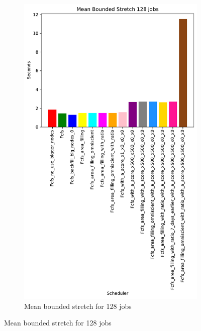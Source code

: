 \documentclass[a4paper]{article}
\begin{document}
\begin{figure}[H]
\begin{subfigure}[b]{0.4\linewidth}\centering\includegraphics[width=0.7\linewidth]{MBSS/plot/Results_Size_And_Data_2022-01-17->2022-01-17_V9532_Mean_Stretch_With_a_Minimum_128_450_128_32_256_4_1024.pdf}\caption{Mean bounded stretch for 128 jobs}\label{45}\end{subfigure}

\end{figure}
\end{document}
